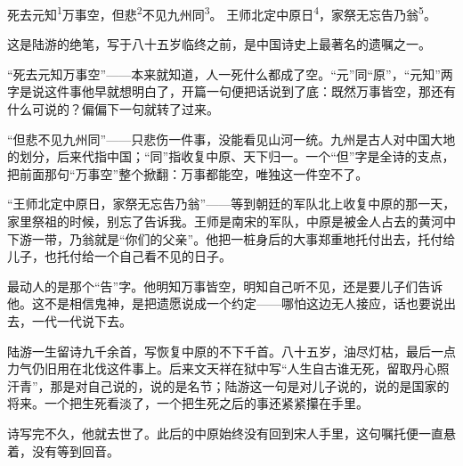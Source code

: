 
\begin{poem}
死去元知\textsuperscript{1}万事空，但悲\textsuperscript{2}不见九州同\textsuperscript{3}。
王师北定中原日\textsuperscript{4}，家祭无忘告乃翁\textsuperscript{5}。
\end{poem}

\begin{annotations}
\end{annotations}

\begin{appreciation}
这是陆游的绝笔，写于八十五岁临终之前，是中国诗史上最著名的遗嘱之一。

“死去元知万事空”——本来就知道，人一死什么都成了空。“元”同“原”，“元知”两字是说这件事他早就想明白了，开篇一句便把话说到了底：既然万事皆空，那还有什么可说的？偏偏下一句就转了过来。

“但悲不见九州同”——只悲伤一件事，没能看见山河一统。九州是古人对中国大地的划分，后来代指中国；“同”指收复中原、天下归一。一个“但”字是全诗的支点，把前面那句“万事空”整个掀翻：万事都能空，唯独这一件空不了。

“王师北定中原日，家祭无忘告乃翁”——等到朝廷的军队北上收复中原的那一天，家里祭祖的时候，别忘了告诉我。王师是南宋的军队，中原是被金人占去的黄河中下游一带，乃翁就是“你们的父亲”。他把一桩身后的大事郑重地托付出去，托付给儿子，也托付给一个自己看不见的日子。

最动人的是那个“告”字。他明知万事皆空，明知自己听不见，还是要儿子们告诉他。这不是相信鬼神，是把遗愿说成一个约定——哪怕这边无人接应，话也要说出去，一代一代说下去。

陆游一生留诗九千余首，写恢复中原的不下千首。八十五岁，油尽灯枯，最后一点力气仍旧用在北伐这件事上。后来文天祥在狱中写“人生自古谁无死，留取丹心照汗青”，那是对自己说的，说的是名节；陆游这一句是对儿子说的，说的是国家的将来。一个把生死看淡了，一个把生死之后的事还紧紧攥在手里。

诗写完不久，他就去世了。此后的中原始终没有回到宋人手里，这句嘱托便一直悬着，没有等到回音。
\end{appreciation}
